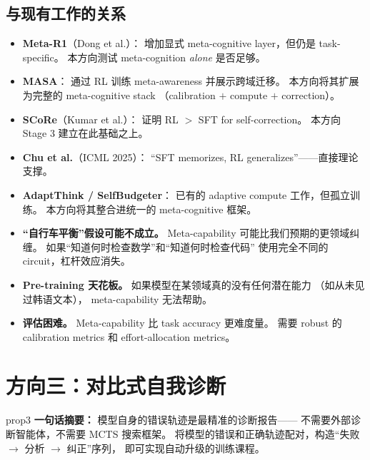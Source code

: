 \documentclass[12pt,a4paper]{article}
\begin{document}
\subsection{与现有工作的关系}

\begin{itemize}[leftmargin=2em]
  \item \textbf{Meta-R1}（Dong et al.）：
    增加显式 meta-cognitive layer，但仍是 task-specific。
    本方向测试 meta-cognition \textit{alone} 是否足够。
  \item \textbf{MASA}：
    通过 RL 训练 meta-awareness 并展示跨域迁移。
    本方向将其扩展为完整的 meta-cognitive stack
    （calibration $+$ compute $+$ correction）。
  \item \textbf{SCoRe}（Kumar et al.）：
    证明 RL $>$ SFT for self-correction。
    本方向 Stage 3 建立在此基础之上。
  \item \textbf{Chu et al.}（ICML 2025）：
    ``SFT memorizes, RL generalizes''——直接理论支撑。
  \item \textbf{AdaptThink / SelfBudgeter}：
    已有的 adaptive compute 工作，但孤立训练。
    本方向将其整合进统一的 meta-cognitive 框架。
\end{itemize}

\begin{riskbox}
\begin{itemize}[leftmargin=1.5em]
  \item \textbf{``自行车平衡''假设可能不成立。}
    Meta-capability 可能比我们预期的更领域纠缠。
    如果``知道何时检查数学''和``知道何时检查代码''
    使用完全不同的 circuit，杠杆效应消失。
  \item \textbf{Pre-training 天花板。}
    如果模型在某领域真的没有任何潜在能力
    （如从未见过韩语文本），
    meta-capability 无法帮助。
  \item \textbf{评估困难。}
    Meta-capability 比 task accuracy 更难度量。
    需要 robust 的 calibration metrics 和 effort-allocation metrics。
\end{itemize}
\end{riskbox}


\newpage
\section{方向三：对比式自我诊断}
\label{sec:prop3}

\begin{proposalbox}{prop3}
\textbf{一句话摘要：}
模型自身的错误轨迹是最精准的诊断报告——
不需要外部诊断智能体，不需要 MCTS 搜索框架。
将模型的错误和正确轨迹配对，构造``失败 $\rightarrow$ 分析 $\rightarrow$ 纠正''序列，
即可实现自动升级的训练课程。
\end{proposalbox}
\end{document}
